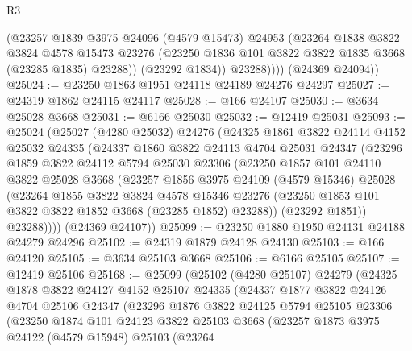 \begin{lexlean}{R3}
\begin{coremodule}
              (@23257
                @1839
                @3975
                @24096
                (@4579 @15473)
                @24953
                (@23264
                  @1838
                  @3822
                  @3824
                  @4578
                  @15473
                  @23276
                  (@23250 @1836 @101 @3822 @3822 @1835 @3668 (@23285 @1835) @23288))
                (@23292 @1834))
              @23288))))
      (@24369 @24094))
@25024 := @23250 @1863 @1951 @24118 @24189 @24276 @24297
@25027 := @24319 @1862 @24115 @24117
@25028 := @166 @24107
@25030 := @3634 @25028 @3668
@25031 := @6166 @25030
@25032 := @12419 @25031
@25093 := @25024
    (@25027
      (@4280 @25032)
      @24276
      (@24325
        @1861
        @3822
        @24114
        @4152
        @25032
        @24335
        (@24337
          @1860
          @3822
          @24113
          @4704
          @25031
          @24347
          (@23296
            @1859
            @3822
            @24112
            @5794
            @25030
            @23306
            (@23250
              @1857
              @101
              @24110
              @3822
              @25028
              @3668
              (@23257
                @1856
                @3975
                @24109
                (@4579 @15346)
                @25028
                (@23264
                  @1855
                  @3822
                  @3824
                  @4578
                  @15346
                  @23276
                  (@23250 @1853 @101 @3822 @3822 @1852 @3668 (@23285 @1852) @23288))
                (@23292 @1851))
              @23288))))
      (@24369 @24107))
@25099 := @23250 @1880 @1950 @24131 @24188 @24279 @24296
@25102 := @24319 @1879 @24128 @24130
@25103 := @166 @24120
@25105 := @3634 @25103 @3668
@25106 := @6166 @25105
@25107 := @12419 @25106
@25168 := @25099
    (@25102
      (@4280 @25107)
      @24279
      (@24325
        @1878
        @3822
        @24127
        @4152
        @25107
        @24335
        (@24337
          @1877
          @3822
          @24126
          @4704
          @25106
          @24347
          (@23296
            @1876
            @3822
            @24125
            @5794
            @25105
            @23306
            (@23250
              @1874
              @101
              @24123
              @3822
              @25103
              @3668
              (@23257
                @1873
                @3975
                @24122
                (@4579 @15948)
                @25103
                (@23264

\end{coremodule}
\end{lexlean}
